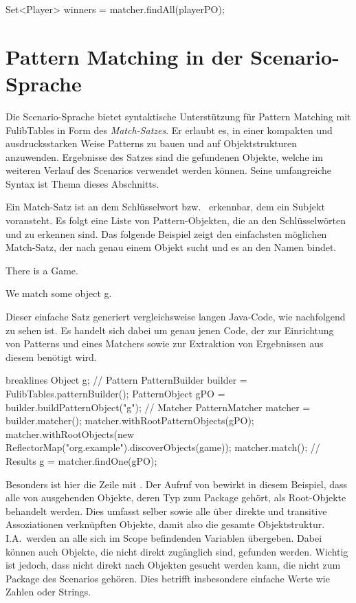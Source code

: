 \begin{jcodeblock}
    Set<Player> winners = matcher.findAll(playerPO);
\end{jcodeblock}

\section{Pattern Matching in der Scenario-Sprache}\label{sec:scenario-pattern-matching}

Die Scenario-Sprache bietet syntaktische Unterstützung für Pattern Matching mit FulibTables in Form des \emph{Match-Satzes}.
Er erlaubt es, in einer kompakten und ausdrucksstarken Weise Patterns zu bauen und auf Objektstrukturen anzuwenden.
Ergebnisse des Satzes sind die gefundenen Objekte, welche im weiteren Verlauf des Scenarios verwendet werden können.
Seine umfangreiche Syntax ist Thema dieses Abschnitts.

Ein Match-Satz ist an dem Schlüsselwort  bzw.\  erkennbar, dem ein Subjekt voransteht.
Es folgt eine Liste von Pattern-Objekten, die an den Schlüsselwörten  und  zu erkennen sind.
Das folgende Beispiel zeigt den einfachsten möglichen Match-Satz, der nach genau einem Objekt sucht und es an den Namen  bindet.

\begin{mdcodeblock}
    There is a Game.

    We match some object g.
\end{mdcodeblock}

Dieser einfache Satz generiert vergleichsweise langen Java-Code, wie nachfolgend zu sehen ist.
Es handelt sich dabei um genau jenen Code, der zur Einrichtung von Patterns und eines Matchers sowie zur Extraktion von Ergebnissen aus diesem benötigt wird.

\begin{jcodeblock*}{breaklines}
    Object g;
    {
        // Pattern
        PatternBuilder builder = FulibTables.patternBuilder();
        PatternObject gPO = builder.buildPatternObject("g");
        // Matcher
        PatternMatcher matcher = builder.matcher();
        matcher.withRootPatternObjects(gPO);
        matcher.withRootObjects(new ReflectorMap("org.example").discoverObjects(game));
        matcher.match();
        // Results
        g = matcher.findOne(gPO);
    }
\end{jcodeblock*}

Besonders ist hier die Zeile mit .
Der Aufruf von  bewirkt in diesem Beispiel, dass alle von  ausgehenden Objekte, deren Typ zum Package  gehört, als Root-Objekte behandelt werden.
Dies umfasst  selber sowie alle über direkte und transitive Assoziationen verknüpften Objekte, damit also die gesamte Objektstruktur.
I.A.\ werden an  alle sich im Scope befindenden Variablen übergeben.
Dabei können auch Objekte, die nicht direkt zugänglich sind, gefunden werden.
Wichtig ist jedoch, dass nicht direkt nach Objekten gesucht werden kann, die nicht zum Package des Scenarios gehören.
Dies betrifft insbesondere einfache Werte wie Zahlen oder Strings.

